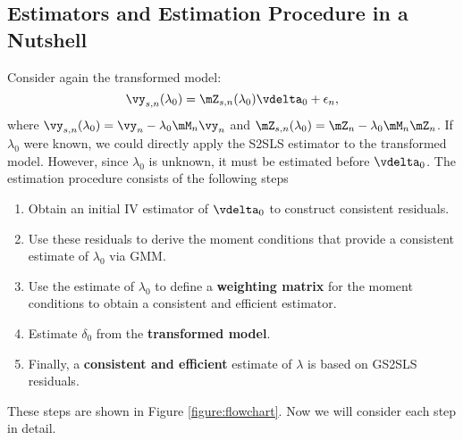 \subsection{Estimators and Estimation Procedure in a Nutshell}

Consider again the transformed model:
\begin{equation*}
  \vy_{s,n}(\lambda_0) = \mZ_{s,n}(\lambda_0)\vdelta_0 + \epsilon_n, 
\end{equation*}
%
where $\vy_{s,n}(\lambda_0) = \vy_n - \lambda_0\mM_n\vy_n$ and $\mZ_{s,n}(\lambda_0) = \mZ_n - \lambda_0\mM_n\mZ_n$. If $\lambda_0$ were known, we could directly apply the S2SLS estimator to the transformed model. However,  since $\lambda_0$ is unknown, it must be estimated before $\vdelta_0$. The estimation procedure consists of the following steps

\begin{enumerate}
  \item Obtain an initial IV estimator of $\vdelta_0$ to construct consistent residuals.
  \item Use these residuals to derive the moment conditions that provide a consistent estimate  of $\lambda_0$ via GMM.
  \item Use the estimate of $\lambda_0$ to define a \textbf{weighting matrix} for the moment conditions to obtain a consistent and efficient estimator. 
  \item Estimate $\delta_0$ from the \textbf{transformed model}.
  \item Finally, a \textbf{consistent and efficient} estimate of $\lambda$ is based on GS2SLS residuals. 
\end{enumerate}

These steps are shown in Figure \ref{figure:flowchart}. Now we will consider each step in detail.

